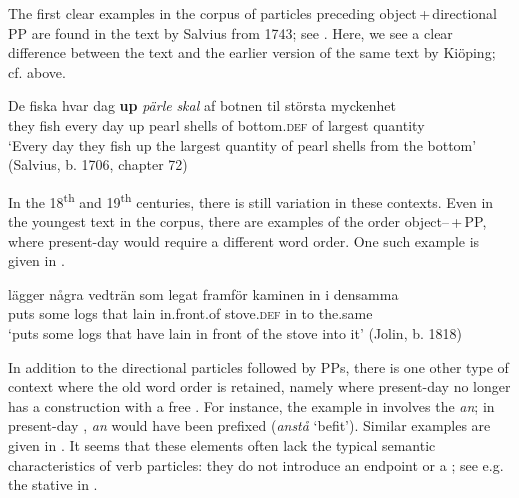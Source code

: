 \documentclass[output=paper]{langscibook}
\begin{document}
\begin{sloppypar}
The first clear examples in the corpus of particles preceding object\,+\,directional PP are found in the text by Salvius from 1743; see . Here, we see a clear difference between the  text and the earlier version of the same text by Kiöping; cf.  above.
\end{sloppypar}

\ea\label{ex:lalu:43}
\gll  De {fiska} {hvar}     {dag} \textbf{up} \textit{pärle} \textit{skal} {af} {botnen} {til} {största} {myckenhet}\\
they   fish     every   day     up     pearl   shells   of     bottom\textsc{.def} of     largest     quantity\\
\glt `Every day they fish up the largest quantity of pearl shells from the bottom'   (Salvius, b. 1706, chapter 72)\\
\z

\begin{sloppypar}
In the 18\textsuperscript{th} and 19\textsuperscript{th} centuries, there is still variation in these contexts. Even in the youngest text in the corpus, there are examples of the order object–\,+\,PP, where present-day  would require a different word order. One such example is given in .
\end{sloppypar}

\ea\label{ex:lalu:44}
\gll  lägger   några   vedträn   som   legat   framför       kaminen in       i     densamma\\
puts       some     logs     that     lain     in.front.of   stove.\textsc{def} in   to   the.same\\
\glt `puts some logs that have lain in front of the stove into it’ (Jolin, b. 1818)\\
\z


In addition to the directional particles followed by PPs, there is one other type of context where the old word order is retained, namely where present-day  no longer has a construction with a free . For instance, the example in  involves the  \textit{an}; in present-day , \textit{an} would have been prefixed (\textit{anstå} ‘befit’). Similar examples are given in . It seems that these elements often lack the typical semantic characteristics of verb particles: they do not introduce an endpoint or a ; see e.g. the stative  in .
\end{document}
